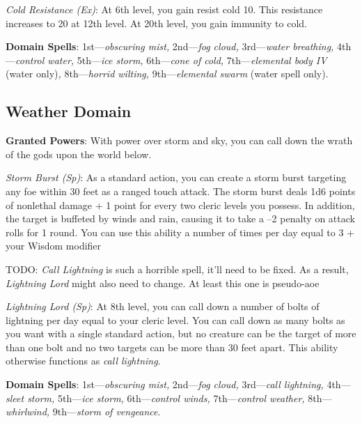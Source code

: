\textit{Cold Resistance (Ex)}: At 6th level, you gain resist cold 10. This resistance increases to 20 at 12th level.
At 20th level, you gain immunity to cold.
				
\textbf{Domain Spells}: 1st---\textit{obscuring mist, }2nd---\textit{fog cloud, }3rd---\textit{water breathing, }4th---\textit{control water, }5th---\textit{ice storm, }6th---\textit{cone of cold, }7th---\textit{elemental body IV }(water only)\textit{, }8th---\textit{horrid wilting, }9th---\textit{elemental swarm }(water spell only).
				
\subsection{Weather Domain}

				
\textbf{Granted Powers}: With power over storm and sky, you can call down the wrath of the gods upon the world below.
				
\textit{Storm Burst (Sp)}: As a standard action, you can create a storm burst targeting any foe within 30 feet as a
ranged touch attack. The storm burst deals 1d6 points of nonlethal damage + 1 point for every two cleric levels you
possess. In addition, the target is buffeted by winds and rain, causing it to take a --2 penalty on attack rolls for
1 round. You can use this ability a number of times per day equal to 3 + your Wisdom modifier

\begin{formal}
 TODO: \textit{Call Lightning} is such a horrible spell, it'll need to be fixed. As a result, \textit{Lightning Lord}
 might also need to change. At least this one is pseudo-aoe
\end{formal}

\textit{Lightning Lord (Sp)}: At 8th level, you can call down a number of bolts of lightning per day equal to your
cleric level. You can call down as many bolts as you want with a single standard action, but no creature can be the
target of more than one bolt and no two targets can be more than 30 feet apart. This ability otherwise functions as
\textit{call lightning}.

\textbf{Domain Spells}: 1st---\textit{obscuring mist, }2nd---\textit{fog cloud, }3rd---\textit{call lightning, }4th---\textit{sleet storm, }5th---\textit{ice storm, }6th---\textit{control winds, }7th---\textit{control weather, }8th---\textit{whirlwind, }9th---\textit{storm of vengeance}.
